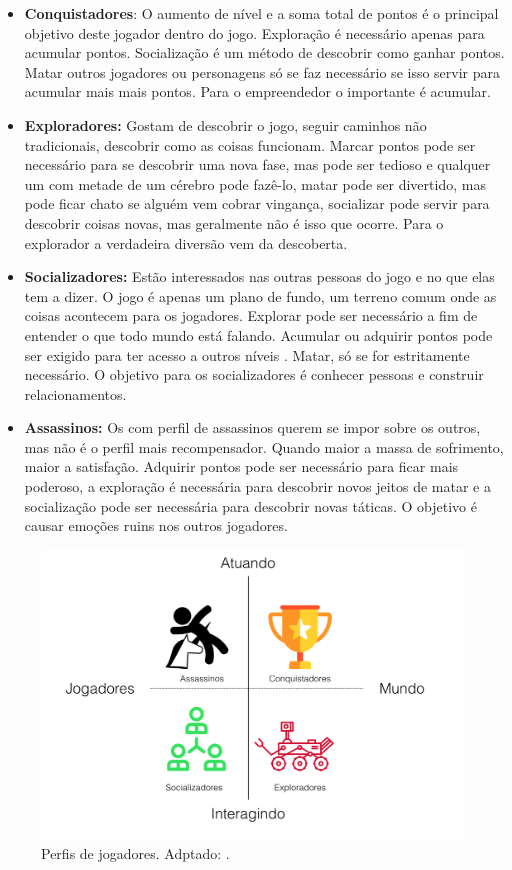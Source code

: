 \begin{itemize}
\item  \textbf {Conquistadores}: O aumento de nível e a soma total de pontos é o principal objetivo deste jogador dentro do jogo. Exploração é necessário apenas para acumular pontos. Socialização é um método de descobrir como ganhar pontos. Matar outros jogadores ou personagens só se faz necessário se isso servir para acumular mais mais pontos. Para o empreendedor o importante é acumular.
\item  \textbf {Exploradores:}  Gostam de descobrir o jogo, seguir caminhos não tradicionais, descobrir como as coisas funcionam. Marcar pontos pode ser necessário para se descobrir uma nova fase, mas pode ser tedioso e qualquer um com metade de um cérebro pode fazê-lo, matar pode ser divertido, mas pode ficar chato se alguém vem cobrar vingança, socializar pode servir para descobrir coisas novas, mas geralmente não é isso que ocorre. Para o explorador a verdadeira diversão vem da descoberta.
\item  \textbf {Socializadores: } Estão interessados nas outras pessoas do jogo e no que elas tem a dizer. O jogo é apenas um plano de fundo, um terreno comum onde as coisas acontecem para os jogadores. Explorar pode ser necessário a fim de entender o que todo mundo está falando. Acumular ou adquirir pontos pode ser exigido para ter acesso a outros níveis . Matar, só se for estritamente necessário. O objetivo para os socializadores é conhecer pessoas e construir relacionamentos.
\item  \textbf{Assassinos:} Os com perfil de assassinos querem se impor sobre os outros, mas não é o perfil mais recompensador. Quando maior a massa de sofrimento, maior a satisfação. Adquirir pontos pode ser necessário para ficar mais poderoso, a exploração é necessária para descobrir novos jeitos de matar e a socialização pode ser necessária para descobrir novas táticas. O objetivo é causar emoções ruins nos outros jogadores.
\end{itemize}

\begin{figure}[h]
	\centering
		\includegraphics[keepaspectratio=true,scale=0.35]{figuras/bartlefig.png}
	\caption{Perfis de jogadores. Adptado: \cite{bartle1996hearts}.\label{bartlefig}
}
\end{figure}

